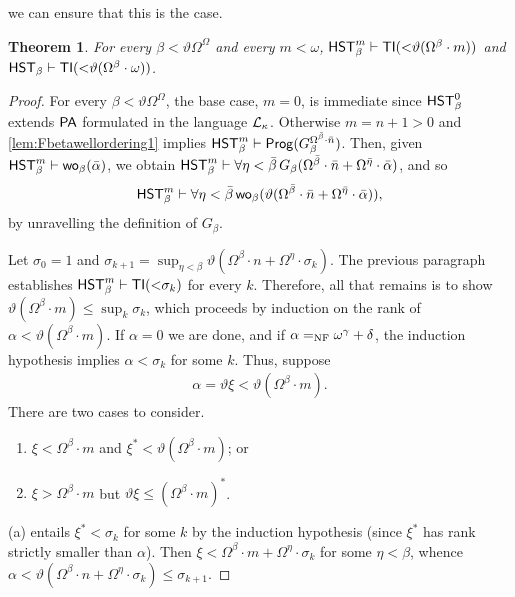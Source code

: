 \documentclass[UKenglish,cleveref,DIV=12]{scrartcl}
\newtheorem{theorem}{Theorem}[section]
\theoremstyle{definition}
\theoremstyle{definition}
\begin{document}
we can ensure that this is the case. %
\begin{theorem}\label{thm:Fbetalowerbound}
  For every $\beta<\vartheta\Omega^\Omega$ and every $m<\omega$,
  $\mathsf{HST}_\beta^{m}\vdash\mathsf{TI}(\mathord<\vartheta(\Omega^\beta\cdot m))$ and $\mathsf{HST}_\beta\vdash\mathsf{TI}(\mathord<\vartheta(\Omega^\beta\cdot\omega))$.
\end{theorem}
\begin{proof}
For every $\beta<\vartheta\Omega^\Omega$, the base case, $m=0$, is immediate
since $\mathsf{HST}_\beta^0$ extends $\mathsf{PA}$ formulated in the language $\mathcal{L}_\kappa$.
Otherwise $m=n+1>0$ and \cref{lem:Fbetawellordering1} implies $\mathsf{HST}_\beta^m\vdash\mathsf{Prog}
(G_\beta^{\Omega^{\bar\beta}\cdot\bar n})$. Then, given $\mathsf{HST}_\beta^m\vdash
\mathsf{wo}_\beta(\bar \alpha)$, we obtain $\mathsf{HST}_\beta^m\vdash
\forall\eta<\bar\beta\,G_\beta(\Omega^{\bar\beta}\cdot\bar
n+\Omega^{\bar\eta}\cdot\bar\alpha)$, and so
\begin{align*}
  \mathsf{HST}_\beta^m\vdash\forall\eta<\bar\beta\,\mathsf{wo}_\beta(\vartheta(\Omega^{\bar \beta}\cdot\bar
  n+\Omega^{\bar \eta}\cdot\bar\alpha)),
\end{align*}
by unravelling the definition of $G_\beta$.

Let $\sigma_0=1$ and $\sigma_{k+1}=\sup_{\eta<\beta}\vartheta(\Omega^{\beta}\cdot
n+\Omega^\eta\cdot\sigma_k)$. The previous paragraph establishes $\mathsf{HST}_\beta^m\vdash
\mathsf{TI}(\mathord<\sigma_k)$ for every $k$. Therefore, all that remains is to show
$\vartheta(\Omega^{\beta}\cdot m)\le\sup_k\sigma_k$, which proceeds by induction
on the rank of $\alpha<\vartheta(\Omega^{\beta}\cdot m)$. If $\alpha=0$ we are
done, and if $\alpha=_{\mathrm{NF}}\omega^\gamma+\delta$, the induction hypothesis implies
$\alpha<\sigma_k$ for some $k$. Thus, suppose
\begin{gather*}
  \alpha=\vartheta\xi<\vartheta(\Omega^{\beta}\cdot m).
\end{gather*}
There are two cases to consider.
\begin{enumerate}
 \item[(a)] $\xi<\Omega^{\beta}\cdot m$ and $\xi^*<\vartheta(\Omega^{\beta}\cdot m)$; or
 \item[(b)] $\xi>\Omega^{\beta}\cdot m$ but $\vartheta\xi\le(\Omega^{\beta}\cdot m)^*$.
\end{enumerate}
(a) entails $\xi^*<\sigma_k$ for some $k$ by the induction hypothesis
(since $\xi^*$ has rank strictly smaller than $\alpha$). Then
$\xi<\Omega^{\beta}\cdot m+\Omega^\eta\cdot\sigma_k$ for some $\eta<\beta$, whence
$\alpha<\vartheta(\Omega^{\beta}\cdot n+\Omega^\eta\cdot\sigma_k)\le\sigma_{k+1}$.


\end{proof}
\end{document}
